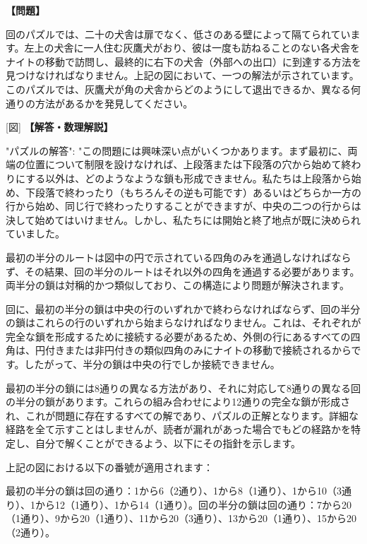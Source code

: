 \documentclass[10pt,a4paper,oneside,openany]{ltjsbook}
\begin{document}
\begin{tcolorbox}[colback=softblue,colframe=primaryblue,title=\textbf{第 336 問：THE GREYHOUND PUZZLE.},arc=2mm,boxrule=1pt,breakable]
\textbf{【問題】}\par\vspace{0.3em}
回のパズルでは、二十の犬舎は扉でなく、低さのある壁によって隔てられています。左上の犬舎に一人住む灰鷹犬がおり、彼は一度も訪ねることのない各犬舎をナイトの移動で訪問し、最終的に右下の犬舎（外部への出口）に到達する方法を見つけなければなりません。上記の図において、一つの解法が示されています。このパズルでは、灰鷹犬が角の犬舎からどのようにして退出できるか、異なる何通りの方法があるかを発見してください。

[図]
\tcblower
\textbf{【解答・数理解説】}\par\vspace{0.3em}
{
"パズルの解答": "この問題には興味深い点がいくつかあります。まず最初に、両端の位置について制限を設けなければ、上段落または下段落の穴から始めて終わりにする以外は、どのようなような鎖も形成できません。私たちは上段落から始め、下段落で終わったり（もちろんその逆も可能です）あるいはどちらか一方の行から始め、同じ行で終わったりすることができますが、中央の二つの行からは決して始めてはいけません。しかし、私たちには開始と終了地点が既に決められていました。

最初の半分のルートは図中の円で示されている四角のみを通過しなければならず、その結果、回の半分のルートはそれ以外の四角を通過する必要があります。両半分の鎖は対稱的かつ類似しており、この構造により問題が解決されます。

回に、最初の半分の鎖は中央の行のいずれかで終わらなければならず、回の半分の鎖はこれらの行のいずれから始まらなければなりません。これは、それぞれが完全な鎖を形成するために接続する必要があるため、外側の行にあるすべての四角は、円付きまたは非円付きの類似四角のみにナイトの移動で接続されるからです。したがって、半分の鎖は中央の行でしか接続できません。

最初の半分の鎖には8通りの異なる方法があり、それに対応して8通りの異なる回の半分の鎖があります。これらの組み合わせにより12通りの完全な鎖が形成され、これが問題に存在するすべての解であり、パズルの正解となります。詳細な経路を全て示すことはしませんが、読者が漏れがあった場合でもどの経路かを特定し、自分で解くことができるよう、以下にその指針を示します。

上記の図における以下の番號が適用されます：

最初の半分の鎖は回の通り：1から6（2通り）、1から8（1通り）、1から10（3通り）、1から12（1通り）、1から14（1通り）。回の半分の鎖は回の通り：7から20（1通り）、9から20（1通り）、11から20（3通り）、13から20（1通り）、15から20（2通り）。

}
\end{tcolorbox}
\end{document}
